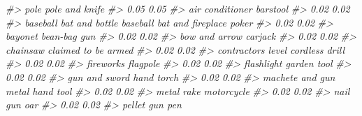 \documentclass[
]{krantz}
\makeatletter
\newenvironment{Shaded}{\begin{snugshade}}{\end{snugshade}}
\newcommand{\CommentTok}[1]{\textcolor[rgb]{0.37,0.37,0.37}{\textit{#1}}}
\newenvironment{kframe}{%
\medskip{}
\setlength{\fboxsep}{.8em}
 \def\at@end@of@kframe{}%
 \ifinner\ifhmode%
  \def\at@end@of@kframe{\end{minipage}}%
  \begin{minipage}{\columnwidth}%
 \fi\fi%
 \def\FrameCommand##1{\hskip\@totalleftmargin \hskip-\fboxsep
 \colorbox{shadecolor}{##1}\hskip-\fboxsep
     \hskip-\linewidth \hskip-\@totalleftmargin \hskip\columnwidth}%
 \MakeFramed {\advance\hsize-\width
   \@totalleftmargin\z@ \linewidth\hsize
   \@setminipage}}%
 {\par\unskip\endMakeFramed%
 \at@end@of@kframe}
\renewenvironment{Shaded}{\begin{kframe}}{\end{kframe}}
\makeatother
\begin{document}
\begin{Shaded}
\begin{Highlighting}[]
\CommentTok{\#\textgreater{}                             pole                   pole and knife }
\CommentTok{\#\textgreater{}                             0.05                             0.05 }
\CommentTok{\#\textgreater{}                  air conditioner                         barstool }
\CommentTok{\#\textgreater{}                             0.02                             0.02 }
\CommentTok{\#\textgreater{}          baseball bat and bottle baseball bat and fireplace poker }
\CommentTok{\#\textgreater{}                             0.02                             0.02 }
\CommentTok{\#\textgreater{}                          bayonet                     bean{-}bag gun }
\CommentTok{\#\textgreater{}                             0.02                             0.02 }
\CommentTok{\#\textgreater{}                    bow and arrow                          carjack }
\CommentTok{\#\textgreater{}                             0.02                             0.02 }
\CommentTok{\#\textgreater{}                         chainsaw              claimed to be armed }
\CommentTok{\#\textgreater{}                             0.02                             0.02 }
\CommentTok{\#\textgreater{}               contractor\textquotesingle{}s level                   cordless drill }
\CommentTok{\#\textgreater{}                             0.02                             0.02 }
\CommentTok{\#\textgreater{}                        fireworks                         flagpole }
\CommentTok{\#\textgreater{}                             0.02                             0.02 }
\CommentTok{\#\textgreater{}                       flashlight                      garden tool }
\CommentTok{\#\textgreater{}                             0.02                             0.02 }
\CommentTok{\#\textgreater{}                    gun and sword                       hand torch }
\CommentTok{\#\textgreater{}                             0.02                             0.02 }
\CommentTok{\#\textgreater{}                  machete and gun                  metal hand tool }
\CommentTok{\#\textgreater{}                             0.02                             0.02 }
\CommentTok{\#\textgreater{}                       metal rake                       motorcycle }
\CommentTok{\#\textgreater{}                             0.02                             0.02 }
\CommentTok{\#\textgreater{}                         nail gun                              oar }
\CommentTok{\#\textgreater{}                             0.02                             0.02 }
\CommentTok{\#\textgreater{}                       pellet gun                              pen }

\end{Highlighting}
\end{Shaded}
\end{document}
